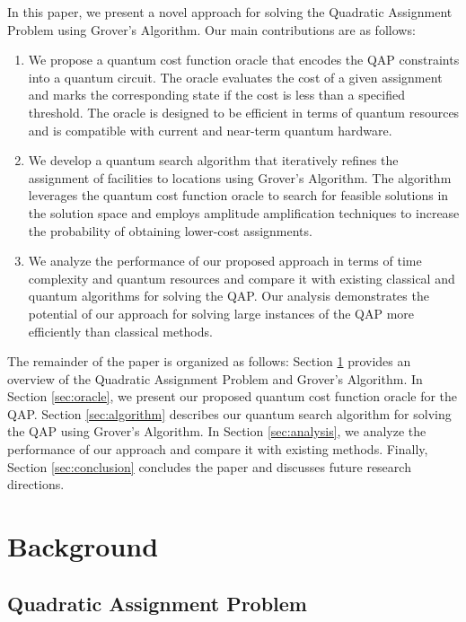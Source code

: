 In this paper, we present a novel approach for solving the Quadratic Assignment Problem using Grover's Algorithm. Our main contributions are as follows:

\begin{enumerate}
    \item We propose a quantum cost function oracle that encodes the QAP constraints into a quantum circuit. The oracle evaluates the cost of a given assignment and marks the corresponding state if the cost is less than a specified threshold. The oracle is designed to be efficient in terms of quantum resources and is compatible with current and near-term quantum hardware.
    
    \item We develop a quantum search algorithm that iteratively refines the assignment of facilities to locations using Grover's Algorithm. The algorithm leverages the quantum cost function oracle to search for feasible solutions in the solution space and employs amplitude amplification techniques to increase the probability of obtaining lower-cost assignments.
    
    \item We analyze the performance of our proposed approach in terms of time complexity and quantum resources and compare it with existing classical and quantum algorithms for solving the QAP. Our analysis demonstrates the potential of our approach for solving large instances of the QAP more efficiently than classical methods.
\end{enumerate}

The remainder of the paper is organized as follows: Section \ref{sec:background} provides an overview of the Quadratic Assignment Problem and Grover's Algorithm. In Section \ref{sec:oracle}, we present our proposed quantum cost function oracle for the QAP. Section \ref{sec:algorithm} describes our quantum search algorithm for solving the QAP using Grover's Algorithm. In Section \ref{sec:analysis}, we analyze the performance of our approach and compare it with existing methods. Finally, Section \ref{sec:conclusion} concludes the paper and discusses future research directions.

\section{Background}\label{sec:background}

\subsection{Quadratic Assignment Problem}

